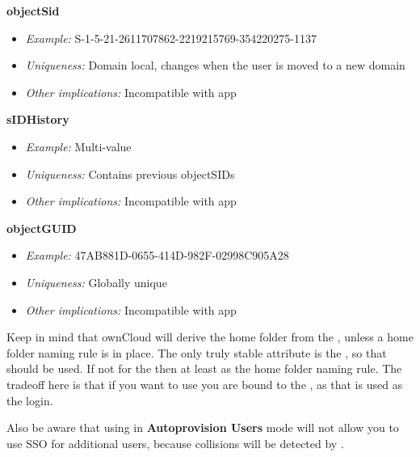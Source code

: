 \documentclass[letterpaper,10pt,english]{sphinxmanual}
\begin{document}
\textbf{objectSid}
\begin{itemize}
\item {} 
\emph{Example:} S-1-5-21-2611707862-2219215769-354220275-1137

\item {} 
\emph{Uniqueness:} Domain local, changes when the user is moved to a new domain

\item {} 
\emph{Other implications:} Incompatible with  app

\end{itemize}

\textbf{sIDHistory}
\begin{itemize}
\item {} 
\emph{Example:} Multi-value

\item {} 
\emph{Uniqueness:} Contains previous objectSIDs

\item {} 
\emph{Other implications:} Incompatible with  app

\end{itemize}

\textbf{objectGUID}
\begin{itemize}
\item {} 
\emph{Example:} 47AB881D-0655-414D-982F-02998C905A28

\item {} 
\emph{Uniqueness:} Globally unique

\item {} 
\emph{Other implications:} Incompatible with  app

\end{itemize}

Keep in mind that ownCloud will derive the home folder from the , unless
a home folder naming rule is in place. The only truly stable attribute is the
, so that should be used. If not for the  then at least as
the home folder naming rule. The tradeoff here is that if you want to use
 you are bound to the , as that is
used as the login.

Also be aware that using  in \textbf{Autoprovision Users} mode
will not allow you to use SSO for additional  users,
because  collisions will be detected by .
\end{document}
